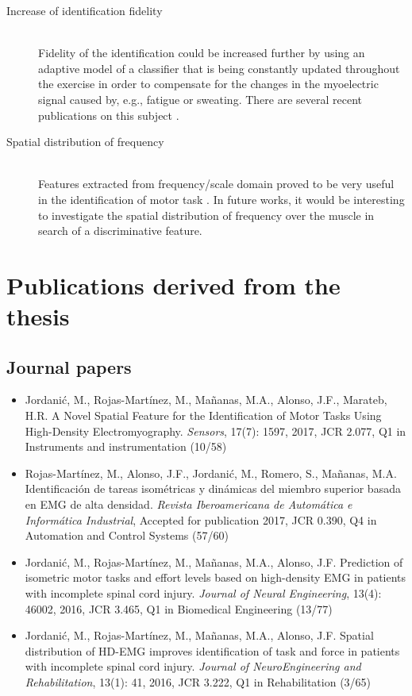 \begin{description}
\item [Increase of identification fidelity] \hfill \\
	Fidelity of the identification could be increased further by using an adaptive model of a classifier that is being constantly updated throughout the exercise in order to compensate for the changes in the myoelectric signal caused by, e.g., fatigue or sweating. There are several recent publications on this subject \citep{Hahne2015, Vidovic2016, Sensinger2009}.

\item[Spatial distribution of frequency] \hfill \\
	Features extracted from frequency/scale domain proved to be very useful in the identification of motor task \citep{Oskoei2007}. In future works, it would be interesting to investigate the spatial distribution of frequency over the muscle in search of a discriminative feature.

\end{description}

\section {Publications derived from the thesis}
\subsection{Journal papers}

\begin{itemize}
\item Jordanić, M., Rojas-Martínez, M., Mañanas, M.A., Alonso, J.F., Marateb, H.R. A Novel Spatial Feature for the Identification of Motor Tasks Using High-Density Electromyography. \textit{Sensors}, 17(7): 1597, 2017, JCR 2.077, Q1 in Instruments and instrumentation (10/58)

\item Rojas-Martínez, M., Alonso, J.F., Jordanić, M., Romero, S., Mañanas, M.A. Identificación de tareas isométricas y dinámicas del miembro superior basada en EMG de alta densidad. \textit{Revista Iberoamericana de Automática e Informática Industrial}, Accepted for publication 2017, JCR 0.390, Q4 in Automation and Control Systems (57/60)

\item Jordanić, M., Rojas-Martínez, M., Mañanas, M.A., Alonso, J.F. Prediction of isometric motor tasks and effort levels based on high-density EMG in patients with incomplete spinal cord injury. \textit{Journal of Neural Engineering}, 13(4): 46002, 2016, JCR 3.465, Q1 in Biomedical Engineering (13/77)

\item Jordanić, M., Rojas-Martínez, M., Mañanas, M.A., Alonso, J.F. Spatial distribution of HD-EMG improves identification of task and force in patients with incomplete spinal cord injury. \textit{Journal of NeuroEngineering and Rehabilitation}, 13(1): 41, 2016, JCR 3.222, Q1 in Rehabilitation (3/65)
\end{itemize}


